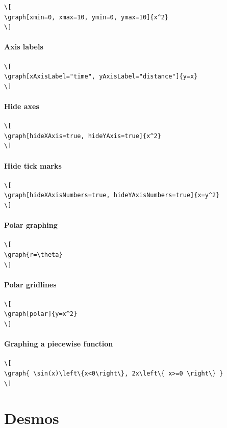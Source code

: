 \documentclass{ximera}
\begin{document}
  
\begin{verbatim}
\[
\graph[xmin=0, xmax=10, ymin=0, ymax=10]{x^2}
\]
\end{verbatim}
\paragraph{Axis labels}

  
\begin{verbatim}
\[
\graph[xAxisLabel="time", yAxisLabel="distance"]{y=x}
\]
\end{verbatim}
\paragraph{Hide axes}

  
\begin{verbatim}
\[
\graph[hideXAxis=true, hideYAxis=true]{x^2}
\]
\end{verbatim}
\paragraph{Hide tick marks}

  
\begin{verbatim}
\[
\graph[hideXAxisNumbers=true, hideYAxisNumbers=true]{x=y^2}
\]
\end{verbatim}
\paragraph{Polar graphing}

  
\begin{verbatim}
\[
\graph{r=\theta}
\]
\end{verbatim}
\paragraph{Polar gridlines}


\begin{verbatim}
\[
\graph[polar]{y=x^2}
\]
\end{verbatim}
\paragraph{Graphing a piecewise function}


\begin{verbatim}
\[
\graph{ \sin(x)\left\{x<0\right\}, 2x\left\{ x>=0 \right\} }
\]
\end{verbatim}


\section{Desmos}
\end{document}
